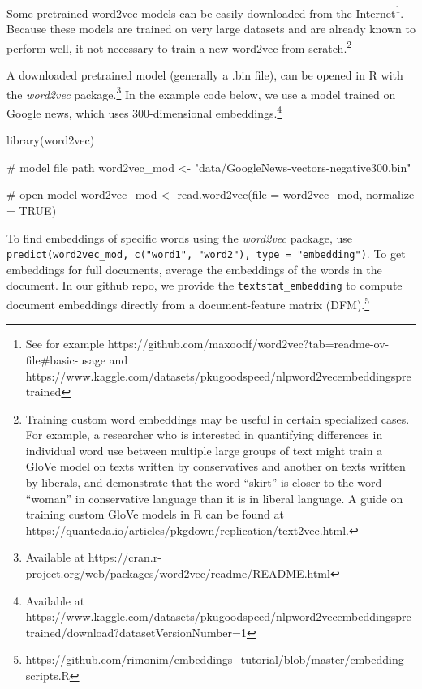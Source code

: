 \documentclass[
  man,
  floatsintext,
  longtable,
  nolmodern,
  notxfonts,
  notimes,
  colorlinks=true,linkcolor=blue,citecolor=blue,urlcolor=blue]{apa7}
\newenvironment{Shaded}{\begin{snugshade}}{\end{snugshade}}
\newcommand{\AttributeTok}[1]{\textcolor[rgb]{0.40,0.45,0.13}{#1}}
\newcommand{\CommentTok}[1]{\textcolor[rgb]{0.37,0.37,0.37}{#1}}
\newcommand{\ConstantTok}[1]{\textcolor[rgb]{0.56,0.35,0.01}{#1}}
\newcommand{\FunctionTok}[1]{\textcolor[rgb]{0.28,0.35,0.67}{#1}}
\newcommand{\NormalTok}[1]{\textcolor[rgb]{0.00,0.23,0.31}{#1}}
\newcommand{\OtherTok}[1]{\textcolor[rgb]{0.00,0.23,0.31}{#1}}
\newcommand{\StringTok}[1]{\textcolor[rgb]{0.13,0.47,0.30}{#1}}
\begin{document}
Some pretrained word2vec models can be easily downloaded from the
Internet\footnote{See for example
  https://github.com/maxoodf/word2vec?tab=readme-ov-file\#basic-usage
  and
  https://www.kaggle.com/datasets/pkugoodspeed/nlpword2vecembeddingspretrained}.
Because these models are trained on very large datasets and are already
known to perform well, it not necessary to train a new word2vec from
scratch.\footnote{Training custom word embeddings may be useful in
  certain specialized cases. For example, a researcher who is interested
  in quantifying differences in individual word use between multiple
  large groups of text might train a GloVe model on texts written by
  conservatives and another on texts written by liberals, and
  demonstrate that the word ``skirt'' is closer to the word ``woman'' in
  conservative language than it is in liberal language. A guide on
  training custom GloVe models in R can be found at
  https://quanteda.io/articles/pkgdown/replication/text2vec.html.}

A downloaded pretrained model (generally a .bin file), can be opened in
R with the \emph{word2vec} package.\footnote{Available at
  https://cran.r-project.org/web/packages/word2vec/readme/README.html}
In the example code below, we use a model trained on Google news, which
uses 300-dimensional embeddings.\footnote{Available at
  https://www.kaggle.com/datasets/pkugoodspeed/nlpword2vecembeddingspretrained/download?datasetVersionNumber=1}

\begin{Shaded}
\begin{Highlighting}[]
\FunctionTok{library}\NormalTok{(word2vec)}

\CommentTok{\# model file path}
\NormalTok{word2vec\_mod }\OtherTok{\textless{}{-}} \StringTok{"data/GoogleNews{-}vectors{-}negative300.bin"}

\CommentTok{\# open model}
\NormalTok{word2vec\_mod }\OtherTok{\textless{}{-}} \FunctionTok{read.word2vec}\NormalTok{(}\AttributeTok{file =}\NormalTok{ word2vec\_mod, }\AttributeTok{normalize =} \ConstantTok{TRUE}\NormalTok{)}
\end{Highlighting}
\end{Shaded}

To find embeddings of specific words using the \emph{word2vec} package,
use
\texttt{predict(word2vec\_mod,\ c("word1",\ "word2"),\ type\ =\ "embedding")}.
To get embeddings for full documents, average the embeddings of the
words in the document. In our github repo, we provide the
\texttt{textstat\_embedding} to compute document embeddings directly
from a document-feature matrix (DFM).\footnote{https://github.com/rimonim/embeddings\_tutorial/blob/master/embedding\_scripts.R}
\end{document}
